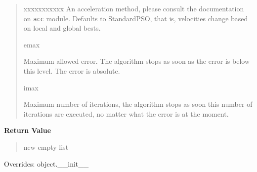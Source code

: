\begin{boxedminipage}{\funcwidth}
\begin{quote}
\begin{Ventry}{xxxxxxxxxxx}
An acceleration method, please consult the documentation on \texttt{acc}
module. Defaults to StandardPSO, that is, velocities change based on
local and global bests.
          \item[emax]


Maximum allowed error. The algorithm stops as soon as the error is
below this level. The error is absolute.
          \item[imax]


Maximum number of iterations, the algorithm stops as soon this
number of iterations are executed, no matter what the error is at
the moment.
        \end{Ventry}

      \end{quote}

      \textbf{Return Value}
    \vspace{-1ex}

      \begin{quote}

new empty list
      \end{quote}

      Overrides: object.\_\_init\_\_

    \end{boxedminipage}

    \label{peach:pso:base:ParticleSwarmOptimizer:restart}

    \vspace{0.5ex}

